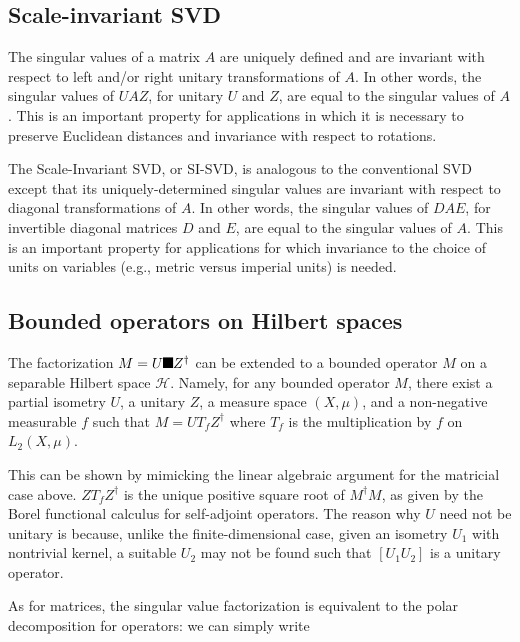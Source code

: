 \documentclass[aps,preprint]{revtex4}%
\providecommand{\U}[1]{\protect\rule{.1in}{.1in}}
\begin{document}
\subsection{Scale-invariant SVD}

The singular values of a matrix $A$ are uniquely defined and are invariant
with respect to left and/or right unitary transformations of $A$. In other
words, the singular values of $UAZ$, for unitary $U$ and $Z$, are equal to the
singular values of $A$. This is an important property for applications in
which it is necessary to preserve Euclidean distances and invariance with
respect to rotations.

The Scale-Invariant SVD, or SI-SVD, is analogous to the conventional SVD
except that its uniquely-determined singular values are invariant with respect
to diagonal transformations of $A$. In other words, the singular values of
$DAE$, for invertible diagonal matrices $D$ and $E$, are equal to the singular
values of $A$. This is an important property for applications for which
invariance to the choice of units on variables (e.g., metric versus imperial
units) is needed.

\subsection{Bounded operators on Hilbert spaces}

The factorization $M=U\U{3a3} Z^{\dagger}$ can be extended to a bounded
operator $M$ on a separable Hilbert space $\mathcal{H}$. Namely, for any
bounded operator $M$, there exist a partial isometry $U$, a unitary $Z$, a
measure space $(X,%
\mu
)$, and a non-negative measurable $f$ such that $M=UT_{f}Z^{\dagger}$ where
$T_{f}$ is the multiplication by $f$ on $L_{2}(X,%
\mu
)$.

This can be shown by mimicking the linear algebraic argument for the matricial
case above. $ZT_{f}Z^{\dagger}$ is the unique positive square root of
$M^{\dagger}M$, as given by the Borel functional calculus for self-adjoint
operators. The reason why $U$ need not be unitary is because, unlike the
finite-dimensional case, given an isometry $U_{1}$ with nontrivial kernel, a
suitable $U_{2}$ may not be found such that $[U_{1}U_{2}]$ is a unitary operator.

As for matrices, the singular value factorization is equivalent to the polar
decomposition for operators: we can simply write%
\end{document}
